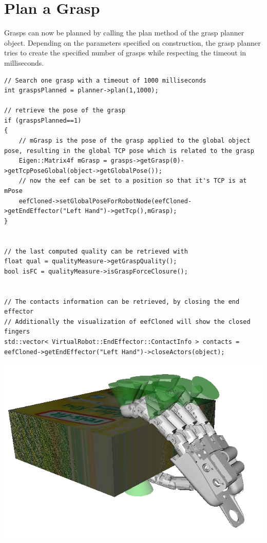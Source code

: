 \section{Plan a Grasp}
Grasps can now be planned by calling the plan method of the grasp planner object. Depending on the parameters specified on construction, the grasp planner tries to create the specified number of grasps while respecting the timeout in milliseconds. 
\begin{lstlisting}
// Search one grasp with a timeout of 1000 milliseconds
int graspsPlanned = planner->plan(1,1000);

// retrieve the pose of the grasp
if (graspsPlanned==1)
{
    // mGrasp is the pose of the grasp applied to the global object pose, resulting in the global TCP pose which is related to the grasp
    Eigen::Matrix4f mGrasp = grasps->getGrasp(0)->getTcpPoseGlobal(object->getGlobalPose());
    // now the eef can be set to a position so that it's TCP is at mPose 
    eefCloned->setGlobalPoseForRobotNode(eefCloned->getEndEffector("Left Hand")->getTcp(),mGrasp);
}


// the last computed quality can be retrieved with
float qual = qualityMeasure->getGraspQuality();
bool isFC = qualityMeasure->isGraspForceClosure();


// The contacts information can be retrieved, by closing the end effector
// Additionally the visualization of eefCloned will show the closed fingers
std::vector< VirtualRobot::EndEffector::ContactInfo > contacts = eefCloned->getEndEffector("Left Hand")->closeActors(object);
\end{lstlisting}
\includegraphics[width=\textwidth]{GraspPlanner1}
